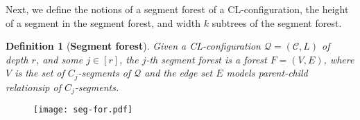 \documentclass{article}
\newtheorem{definition}[theorem]{Definition}
\numberwithin{claimcounter}{lemma}
\begin{document}
Next, we define the notions of a segment forest of a CL-configuration, the height of a segment in the  segment forest, and width $k$ subtrees of the segment forest. 


\begin{definition}[\bf{Segment forest}]
    Given a CL-configuration $\mathcal{Q}=(\mathcal{C},L)$ of depth $r$, and some $j \in [r]$, the \emph{$j$-th segment forest} is a forest $F = (V,E)$, where $V$ is the set of $C_j$-segments of $\mathcal{Q}$ and the edge set $E$ models parent-child relationsip of $C_j$-segments. 
\end{definition}

\begin{figure}[htp]
\centering

  \texttt{[image: seg-for.pdf]}

\bigskip

\usetikzlibrary{shapes.geometric}


\end{figure}
\end{document}
